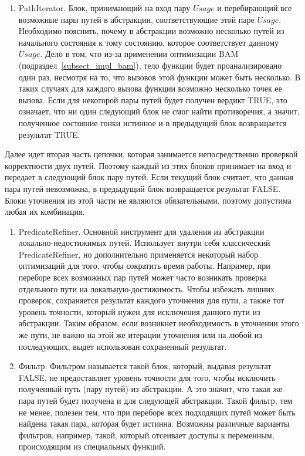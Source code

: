 \begin{enumerate}
\item PathIterator. Блок, принимающий на вход пару $Usage$ и перебирающий все возможные пары путей в абстракции, соответствующие этой паре $Usage$. Необходимо пояснить, почему в абстракции возможно несколько путей из начального состояния к тому состоянию, которое соответствует данному $Usage$. Дело в том, что из-за применении оптимизации BAM (подраздел~\ref{subsect_impl_bam}), тело функции будет проанализировано один раз, несмотря на то, что вызовов этой функции может быть несколько. В таких случаях для каждого вызова функции возможно несколько точек ее вызова. Если для некоторой пары путей будет получен вердикт TRUE, это означает, что ни один следующий блок не смог найти противоречия, а значит, полученное состояние гонки истинное и в предыдущий блок возвращается результат TRUE. 

\end{enumerate}

Далее идет вторая часть цепочки, которая занимается непосредственно проверкой корректности двух путей. Поэтому каждый из этих блоков принимает на вход и передает в следующий блок пару путей. Если текущий блок считает, что данная пара путей невозможна, в предыдущий блок возвращается результат FALSE.
Блоки уточнения из этой части не являются обязательными, поэтому допустима любая их комбинация.

\begin{enumerate}

\item PredicateRefiner. Основной инструмент для удаления из абстракции локально-недостижимых путей. 
Использует внутри себя классический PredicateRefiner, но дополнительно применяется некоторый набор оптимизаций для того, чтобы сократить время работы.
Например, при переборе всех возможных пар путей может часто возникать проверка отдельного пути на локальную-достижимость. 
Чтобы избежать лишних проверок, сохраняется результат каждого уточнения для пути, а также тот уровень точности, который нужен для исключения данного пути из абстракции.
Таким образом, если возникнет необходимость в уточнении этого же пути, не важно на этой же итерации уточнения или на любой из последующих, выдет использован сохраненный результат. 

\item Фильтр. Фильтром называется такой блок, который, выдавая результат FALSE, не предоставляет уровень точности для того, чтобы исключить полученный путь (пару путей) из абстракции. А это значит, что такая же пара путей будет получена и для следующей абстракции.
Такой фильтр, тем не менее, полезен тем, что при переборе всех подходящих путей может быть найдена такая пара, которая будет истинна.
Возможны различные варианты фильтров, например, такой, который отсеивает доступы к переменным, происходящим из специальных функций. 

\end{enumerate}

